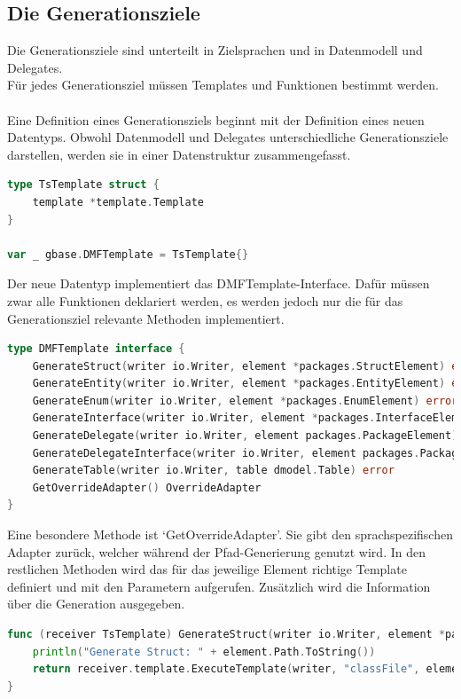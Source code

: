 \documentclass[./einleitung.tex]{subfiles}
\begin{document}
    \subsection{Die Generationsziele}\label{subsec:die-generationsziele}
    Die Generationsziele sind unterteilt in Zielsprachen und in Datenmodell und Delegates.\\
    Für jedes Generationsziel müssen Templates und Funktionen bestimmt werden.
    \\\\
    Eine Definition eines Generationsziels beginnt mit der Definition eines neuen Datentyps.
    Obwohl Datenmodell und Delegates unterschiedliche Generationsziele darstellen, werden sie in einer Datenstruktur zusammengefasst.
    \begin{lstlisting}[language=Go, caption=Definition des TypeScript Generationsziel, label=lst:TsTemplate]
type TsTemplate struct {
	template *template.Template
}

var _ gbase.DMFTemplate = TsTemplate{}
    \end{lstlisting}
    Der neue Datentyp implementiert das DMFTemplate-Interface.
    Dafür müssen zwar alle Funktionen deklariert werden, es werden jedoch nur die für das Generationsziel relevante Methoden implementiert.
    \begin{lstlisting}[language=Go, caption=Definition des DMFTemplate-Interfaces, label=lst:DMFTemplate]
type DMFTemplate interface {
	GenerateStruct(writer io.Writer, element *packages.StructElement) error
	GenerateEntity(writer io.Writer, element *packages.EntityElement) error
	GenerateEnum(writer io.Writer, element *packages.EnumElement) error
	GenerateInterface(writer io.Writer, element *packages.InterfaceElement) error
	GenerateDelegate(writer io.Writer, element packages.PackageElement) error
	GenerateDelegateInterface(writer io.Writer, element packages.PackageElement) error
	GenerateTable(writer io.Writer, table dmodel.Table) error
    GetOverrideAdapter() OverrideAdapter
}
    \end{lstlisting}
    Eine besondere Methode ist `GetOverrideAdapter'.
    Sie gibt den sprachspezifischen Adapter zurück, welcher während der Pfad-Generierung genutzt wird.
    \newpage
    In den restlichen Methoden wird das für das jeweilige Element richtige Template definiert und mit den Parametern aufgerufen.
    Zusätzlich wird die Information über die Generation ausgegeben.
    \begin{lstlisting}[language=Go, caption=Aufruf der Generation einer TypeScript Klasse, label=lst:genTsClass]
func (receiver TsTemplate) GenerateStruct(writer io.Writer, element *packages.StructElement) error {
	println("Generate Struct: " + element.Path.ToString())
	return receiver.template.ExecuteTemplate(writer, "classFile", element)
}
    \end{lstlisting}
\end{document}
